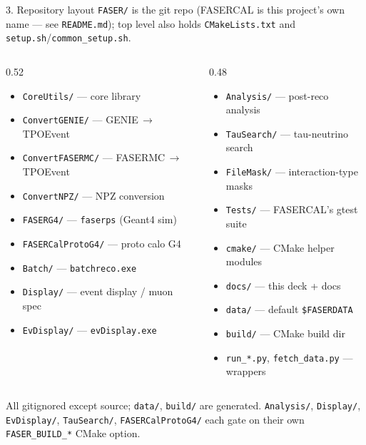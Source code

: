 \documentclass[aspectratio=169]{beamer}
\begin{document}
\begin{frame}[fragile]{3. Repository layout}
  \scriptsize \texttt{FASER/} is the git repo (FASERCAL is this project's own
  name --- see \texttt{README.md}); top level also holds
  \texttt{CMakeLists.txt} and \texttt{setup.sh}/\texttt{common\_setup.sh}.
  \vspace{0.2cm}
  \begin{columns}[T]
    \begin{column}{0.52\textwidth}
      \tiny
      \begin{itemize}
        \setlength{\itemsep}{0pt}
        \item \texttt{CoreUtils/} --- core library
        \item \texttt{ConvertGENIE/} --- GENIE\,$\to$\,TPOEvent
        \item \texttt{ConvertFASERMC/} --- FASERMC\,$\to$\,TPOEvent
        \item \texttt{ConvertNPZ/} --- NPZ conversion
        \item \texttt{FASERG4/} --- \texttt{faserps} (Geant4 sim)
        \item \texttt{FASERCalProtoG4/} --- proto calo G4
        \item \texttt{Batch/} --- \texttt{batchreco.exe}
        \item \texttt{Display/} --- event display / muon spec
        \item \texttt{EvDisplay/} --- \texttt{evDisplay.exe}
      \end{itemize}
    \end{column}
    \begin{column}{0.48\textwidth}
      \tiny
      \begin{itemize}
        \setlength{\itemsep}{0pt}
        \item \texttt{Analysis/} --- post-reco analysis
        \item \texttt{TauSearch/} --- tau-neutrino search
        \item \texttt{FileMask/} --- interaction-type masks
        \item \texttt{Tests/} --- FASERCAL's gtest suite
        \item \texttt{cmake/} --- CMake helper modules
        \item \texttt{docs/} --- this deck + docs
        \item \texttt{data/} --- default \texttt{\$FASERDATA}
        \item \texttt{build/} --- CMake build dir
        \item \texttt{run\_*.py}, \texttt{fetch\_data.py} --- wrappers
      \end{itemize}
    \end{column}
  \end{columns}
  \vspace{0.15cm}
  \scriptsize All gitignored except source; \texttt{data/}, \texttt{build/}
  are generated. \texttt{Analysis/}, \texttt{Display/}, \texttt{EvDisplay/},
  \texttt{TauSearch/}, \texttt{FASERCalProtoG4/} each gate on their own
  \texttt{FASER\_BUILD\_*} CMake option.
\end{frame}
\end{document}
